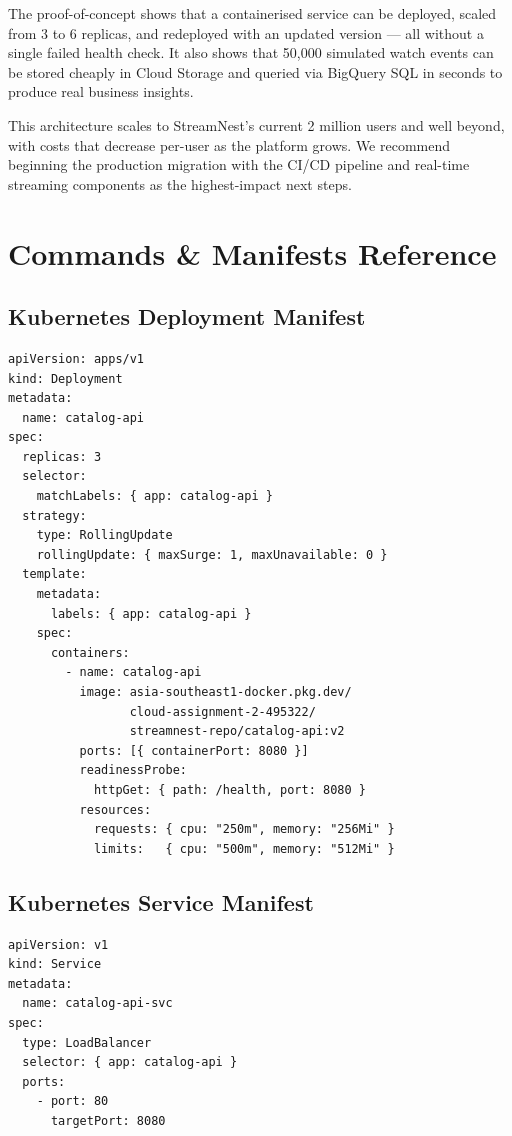 \documentclass[12pt, a4paper]{article}
\begin{document}
The proof-of-concept shows that a containerised service can be deployed, scaled from 3 to 6 replicas, and redeployed with an updated version — all without a single failed health check. It also shows that 50,000 simulated watch events can be stored cheaply in Cloud Storage and queried via BigQuery SQL in seconds to produce real business insights.

This architecture scales to StreamNest's current 2 million users and well beyond, with costs that decrease per-user as the platform grows. We recommend beginning the production migration with the CI/CD pipeline and real-time streaming components as the highest-impact next steps.

\appendix
\newpage
\section{Commands \& Manifests Reference}

\subsection{Kubernetes Deployment Manifest}

\begin{lstlisting}[style=gcpcode]
apiVersion: apps/v1
kind: Deployment
metadata:
  name: catalog-api
spec:
  replicas: 3
  selector:
    matchLabels: { app: catalog-api }
  strategy:
    type: RollingUpdate
    rollingUpdate: { maxSurge: 1, maxUnavailable: 0 }
  template:
    metadata:
      labels: { app: catalog-api }
    spec:
      containers:
        - name: catalog-api
          image: asia-southeast1-docker.pkg.dev/
                 cloud-assignment-2-495322/
                 streamnest-repo/catalog-api:v2
          ports: [{ containerPort: 8080 }]
          readinessProbe:
            httpGet: { path: /health, port: 8080 }
          resources:
            requests: { cpu: "250m", memory: "256Mi" }
            limits:   { cpu: "500m", memory: "512Mi" }
\end{lstlisting}

\subsection{Kubernetes Service Manifest}

\begin{lstlisting}[style=gcpcode]
apiVersion: v1
kind: Service
metadata:
  name: catalog-api-svc
spec:
  type: LoadBalancer
  selector: { app: catalog-api }
  ports:
    - port: 80
      targetPort: 8080
\end{lstlisting}
\end{document}
